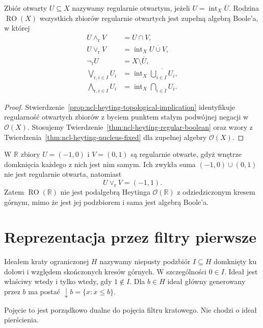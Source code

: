 \begin{wniosek}
\label{cor:ncl-heyting-regular-open}
Zbiór otwarty $U\subseteq X$ nazywamy regularnie
otwartym, jeżeli $U=\operatorname{int}_X\overline U$.
Rodzina $\operatorname{RO}(X)$ wszystkich
zbiorów regularnie otwartych jest zupełną
algebrą Boole'a, w której
\[
\begin{aligned}
 U\wedge_{\mathrm r}V&=U\cap V,\\
 U\vee_{\mathrm r}V&=\operatorname{int}_X\overline{U\cup V},\\
 \neg_{\mathrm r}U&=X\setminus\overline U,\\
 \bigvee_{\mathrm r,i\in I}U_i
 &=\operatorname{int}_X\overline{\bigcup_{i\in I}U_i},\\
 \bigwedge_{\mathrm r,i\in I}U_i
 &=\operatorname{int}_X\bigcap_{i\in I}U_i.
\end{aligned}
\]
\end{wniosek}
\begin{proof}
Stwierdzenie~\ref{prop:ncl-heyting-topological-implication}
identyfikuje regularność otwartych zbiorów
z byciem punktem stałym podwójnej negacji
w $\mathcal O(X)$.
Stosujemy Twierdzenie~\ref{thm:ncl-heyting-regular-boolean}
oraz wzory z Twierdzenia~\ref{thm:ncl-heyting-nucleus-fixed}
dla zupełnej algebry $\mathcal O(X)$.
\end{proof}

\begin{przyklad}
\label{ex:ncl-heyting-regular-open-join}
W $\mathbb R$ zbiory $U=(-1,0)$ i $V=(0,1)$
są regularnie otwarte, gdyż wnętrze domknięcia
każdego z nich jest nim samym.
Ich zwykła suma $(-1,0)\cup(0,1)$ nie jest
regularnie otwarta, natomiast
\[
 U\vee_{\mathrm r}V=(-1,1).
\]
Zatem $\operatorname{RO}(\mathbb R)$ nie jest
podalgebrą Heytinga $\mathcal O(\mathbb R)$
z odziedziczonym kresem górnym, mimo że
jest jej podzbiorem i sama jest algebrą Boole'a.
\end{przyklad}

\section{Reprezentacja przez filtry pierwsze}

\begin{definicja}
\label{def:ncl-heyting-ideal}
Ideałem kraty ograniczonej $H$ nazywamy niepusty
podzbiór $I\subseteq H$ domknięty ku dołowi
i względem skończonych kresów górnych.
W szczególności $0\in I$. Ideał jest właściwy
wtedy i tylko wtedy, gdy $1\notin I$.
Dla $b\in H$ ideał główny generowany przez $b$
ma postać $\downarrow b=\{x:x\leq b\}$.
\end{definicja}
Pojęcie to jest porządkowo dualne do pojęcia
filtru kratowego. Nie chodzi o ideał pierścienia.

